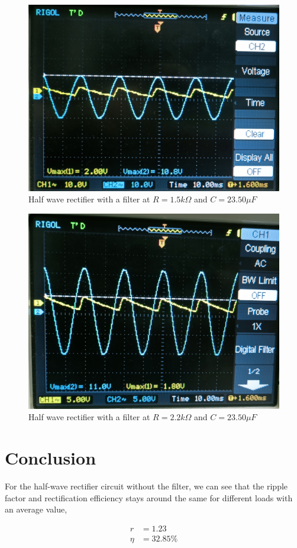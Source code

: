 \begin{figure}[H]
    \centering
    \includegraphics[width=0.72\columnwidth]{images/31.jpg}
    \caption{Half wave rectifier with a filter at $R =1.5k\Omega$ and $C = 23.50\mu F$}\end{figure}

\begin{figure}[H]
    \centering
    \includegraphics[width=0.72\columnwidth]{images/33.jpg}
    \caption{Half wave rectifier with a filter at $R = 2.2k\Omega$ and $C =23.50 \mu F$}
\end{figure}

\section{Conclusion}
For the half-wave rectifier circuit without the filter, we can see that the ripple factor and rectification efficiency stays around the same for different loads with an average value,

\begin{align*}
    r &= 1.23\\
    \eta &= 32.85\%
\end{align*}

